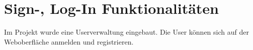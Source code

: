 \section{Sign-, Log-In Funktionalitäten}
Im Projekt wurde eine Userverwaltung eingebaut. Die User können sich auf der Weboberfläche anmelden und registrieren. 